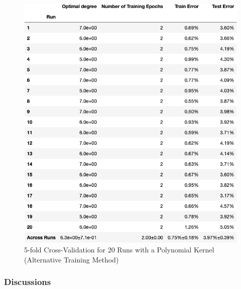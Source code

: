 \documentclass[12pt]{article}
\begin{document}
\begin{itemize}
    \begin{figure}[h]
    \centering
    \includegraphics[scale=0.5]{outputs/part1/q6_performance.png}
    \caption{5-fold Cross-Validation for 20 Runs with a Polynomial Kernel (Alternative Training Method)}
    \label{fig:11}
    \end{figure}





\end{itemize}
\newpage
\subsubsection{Discussions}
\end{document}
